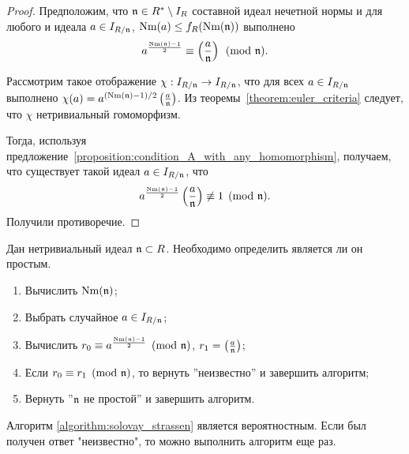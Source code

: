 \documentclass[_00_dissertation.tex]{subfiles}
\begin{document}
\begin{proof}
    Предположим, что $\mathfrak{n} \in R^{*} \setminus I_{R}$ составной идеал нечетной нормы и для любого и идеала $a \in I_{R/\mathfrak{n}}$, $\textrm{Nm}(a) \le f_R(\textrm{Nm}(\mathfrak{n}))$ выполнено
    \begin{equation*}
        a^{\frac{\textrm{Nm}(\mathfrak{n}) - 1}{2}} \equiv \left(\frac{a}{\mathfrak{n}}\right) \pmod{\mathfrak{n}}.
    \end{equation*}
    
    Рассмотрим такое отображение $\chi: I_{R/\mathfrak{n}} \to I_{R/\mathfrak{n}}$, что для всех $a \in I_{R/\mathfrak{n}}$ выполнено $\chi(a) = a^{(\textrm{Nm}(\mathfrak{n}) - 1)/2}\left(\frac{a}{\mathfrak{n}}\right)$.
    Из теоремы~\ref{theorem:euler_criteria} следует, что $\chi$ нетривиальный гомоморфизм.
    
    Тогда, используя предложение~\ref{proposition:condition_A_with_any_homomorphism}, получаем, что существует такой идеал $a \in I_{R/\mathfrak{n}}$, что
    \begin{equation*}
        a^{\frac{\textrm{Nm}(\mathfrak{n}) - 1}{2}} \left(\frac{a}{\mathfrak{n}}\right) \not\equiv 1 \pmod{\mathfrak{n}}.
    \end{equation*}
    Получили противоречие.
\end{proof}

\begin{algorithm}\label{algorithm:solovay_strassen}
    Дан нетривиальный идеал $\mathfrak{n} \subset R$.
    Необходимо определить является ли он простым.

    \begin{enumerate}
        \item Вычислить $\textrm{Nm}(\mathfrak{n})$;
        
        \item Выбрать случайное $a \in I_{R/\mathfrak{n}}$;

        \item Вычислить $r_0 \equiv a^{\frac{\textrm{Nm}(\mathfrak{n}) - 1}{2}} \pmod{\mathfrak{n}}$, $r_1 = \left(\frac{a}{\mathfrak{n}}\right)$;

        \item Если $r_0 \equiv r_1 \pmod{\mathfrak{n}}$, то вернуть ''неизвестно'' и завершить алгоритм;

        \item Вернуть ''$\mathfrak{n}$ не простой'' и завершить алгоритм.
    \end{enumerate}
\end{algorithm}

\begin{remark}
    Алгоритм \ref{algorithm:solovay_strassen} является вероятностным.
    Если был получен ответ "неизвестно", то можно выполнить алгоритм еще раз.
\end{remark}
\end{document}
